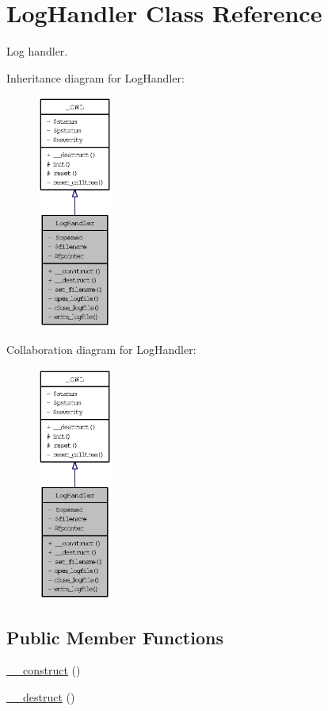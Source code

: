 \hypertarget{classLogHandler}{
\section{LogHandler Class Reference}
\label{classLogHandler}
}
Log handler.  


Inheritance diagram for LogHandler:\nopagebreak
\begin{figure}[H]
\begin{center}
\leavevmode
\includegraphics[width=70pt]{classLogHandler__inherit__graph}
\end{center}
\end{figure}
Collaboration diagram for LogHandler:\nopagebreak
\begin{figure}[H]
\begin{center}
\leavevmode
\includegraphics[width=70pt]{classLogHandler__coll__graph}
\end{center}
\end{figure}
\subsection*{Public Member Functions}
\begin{CompactItemize}
\item 
\hyperlink{classLogHandler_acca49c4394109f4ccc494048a0b2cab}{\_\-\_\-construct} ()
\item 
\hyperlink{classLogHandler_acd0c653489cf221423b9edd62e81458}{\_\-\_\-destruct} ()
\end{CompactItemize}
